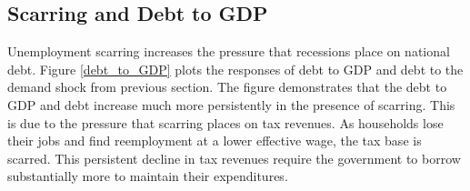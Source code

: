 \subsection{Scarring and Debt to GDP}

Unemployment scarring increases the pressure that recessions place on national debt. Figure \ref{debt_to_GDP} plots the responses of debt to GDP and debt to the demand shock from previous section. The figure demonstrates that the debt to GDP and debt increase much more persistently in the presence of scarring. This is due to the pressure that scarring places on tax revenues. As households lose their jobs and find reemployment at a lower effective wage, the tax base is scarred. This persistent decline in tax revenues require the government to borrow substantially more to maintain their expenditures.


